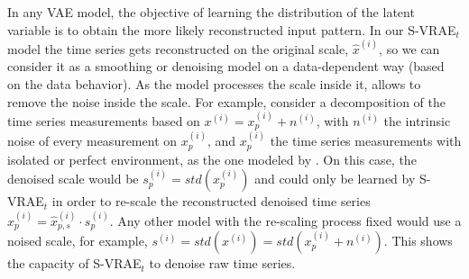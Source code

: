In any VAE model, the objective of learning the distribution of the latent variable is to obtain the more likely reconstructed input pattern. In our S-VRAE$_t$ model the time series gets reconstructed on the original scale, $\hat{x}^{(i)}$, so we can consider it as a smoothing or denoising model on a data-dependent way (based on the data behavior).
As the model processes the scale inside it, allows to remove the noise inside the scale.
For example, consider a decomposition of the time series measurements based on $x^{(i)} =  x_p^{(i)} + n^{(i)}$, with $n^{(i)}$ the intrinsic noise of every measurement on $x_p^{(i)}$, and $x_p^{(i)}$ the time series measurements with isolated or perfect environment, as the one modeled by \citep{mandel2002analytic}. 
On this case, the denoised scale would be $s_p^{(i)} = std(x_p^{(i)})$ and could only be learned by S-VRAE$_t$ in order to re-scale the reconstructed denoised time series $\hat{x}_p^{(i)} = \hat{x}_{p,s}^{(i)}\cdot s_p^{(i)}$. 
Any other model with the re-scaling process fixed would use a noised scale, for example, $s^{(i)} = std(x^{(i)}) = std(x_p^{(i)} + n^{(i)})$.
This shows the capacity of S-VRAE$_t$ to denoise raw time series.





